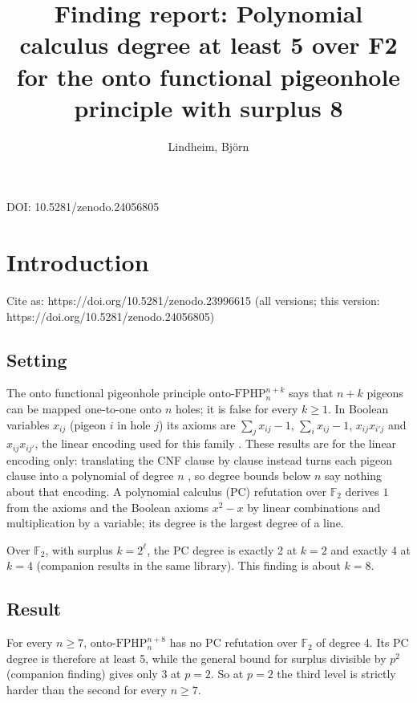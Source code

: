 \documentclass{article}
\title{Finding report: Polynomial calculus degree at least 5 over F2 for the onto functional pigeonhole principle with surplus 8}
\author{Lindheim, Björn}
\date{}
\begin{document}
\maketitle
\begin{center}DOI: 10.5281/zenodo.24056805\end{center}
\section{Introduction}
\label{sec:pc-degree-5-onto-fphp-surplus-8}

Cite as: https://doi.org/10.5281/zenodo.23996615 (all versions; this version: https://doi.org/10.5281/zenodo.24056805)

\subsection*{Setting}

The onto functional pigeonhole principle $\mathrm{onto\text{-}FPHP}^{n+k}_n$ says that $n+k$
pigeons can be mapped one-to-one onto $n$ holes; it is false for every $k\ge1$. In Boolean
variables $x_{ij}$ (pigeon $i$ in hole $j$) its axioms are $\sum_j x_{ij}-1$,
$\sum_i x_{ij}-1$, $x_{ij}x_{i'j}$ and $x_{ij}x_{ij'}$, the linear encoding used for this family
\cite{beame1998counting,razborov2001php}. These results are for the linear encoding only: translating the CNF clause by clause instead turns each pigeon clause into a polynomial of degree $n$ \cite{razborov2001php}, so degree bounds below $n$ say nothing about that encoding. A polynomial calculus (PC) refutation over
$\mathbb F_2$ derives $1$ from the axioms and the Boolean axioms $x^2-x$ by linear combinations
and multiplication by a variable; its degree is the largest degree of a line.

Over $\mathbb F_2$, with surplus $k=2^\ell$, the PC degree is exactly 2 at $k=2$ and exactly 4 at
$k=4$ (companion results in the same library). This finding is about $k=8$.

\subsection*{Result}

For every $n\ge7$, $\mathrm{onto\text{-}FPHP}^{n+8}_n$ has no PC refutation over $\mathbb F_2$ of
degree 4. Its PC degree is therefore at least 5, while the general bound for surplus divisible
by $p^2$ (companion finding) gives only 3 at $p=2$. So at $p=2$ the third level is strictly
harder than the second for every $n\ge7$.
\end{document}
